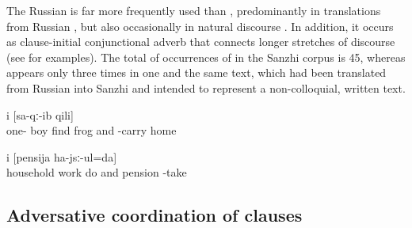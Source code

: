 The Russian   is far more frequently used than , predominantly in translations from Russian , but also occasionally in natural discourse . In addition, it occurs as clause-initial conjunctional adverb   that connects longer stretches of discourse (see  for examples). The total  of occurrences of  in the Sanzhi corpus is 45, whereas   appears only three times in one and the same text, which had been translated from Russian into Sanzhi and intended to represent a non-colloquial, written text.
%
\begin{exe}
	\ex	\label{ex:‎‎‎Once a boy found a frog and brought it home}
		i	[sa-qː-ib	qili]\\
		one-	boy	find frog	and	-carry	home\\
	\glt	{}

	\ex	\label{ex:‎I am doing my house work and get a pension.}
	\gll	[di-la	xazajstweni	ʡaˁči	d-irq'-ul=da]	i	[pensija	ha-jsː-ul=da]\\
			household	work	do	and	pension	-take\\
	\glt	{}
\end{exe}



\subsection{Adversative coordination of clauses}
\label{ssec:Adversative coordination of clauses}

